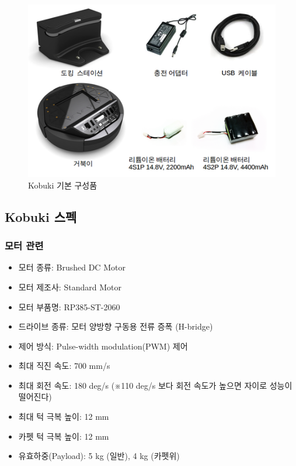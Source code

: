 \begin{figure}[h]
\centering\includegraphics[width=0.7\columnwidth]{pictures/chapter10/kobuki_parts.png}
\caption{Kobuki 기본 구성품}
\end{figure}

\subsection{Kobuki 스펙}

\subsubsection{모터 관련}

\begin{itemize}[leftmargin=*]
\item 모터 종류: Brushed DC Motor
\item 모터 제조사: Standard Motor
\item 모터 부품명: RP385-ST-2060
\end{itemize}

\begin{itemize}[leftmargin=*]
\item 드라이브 종류: 모터 양방향 구동용 전류 증폭 (H-bridge)
\item 제어 방식: Pulse-width modulation(PWM) 제어
\item 최대 직진 속도: 700 mm/s
\item 최대 회전 속도: 180 deg/s (※110 deg/s 보다 회전 속도가 높으면 자이로 성능이 떨어진다)
\item 최대 턱 극복 높이: 12 mm
\item 카펫 턱 극복 높이: 12 mm
\item 유효하중(Payload): 5 kg (일반), 4 kg (카펫위)
\end{itemize}

